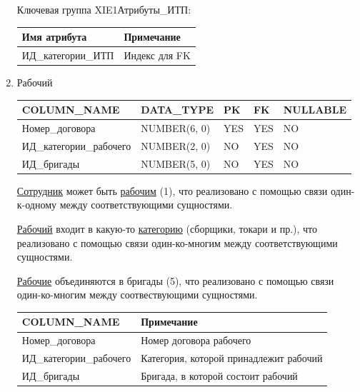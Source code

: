 \begin{enumerate}
\begin{tabular}{|p{4cm}|p{5cm}|}
    \end{tabular}

    Ключевая группа XIE1Атрибуты\_ИТП:

    \begin{tabular}{|p{4cm}|p{5cm}|} \hline

        {\bf Имя атрибута} & {\bf Примечание} \\ \hline
        ИД\_категории\_ИТП & Индекс для FK \\ \hline

    \end{tabular}

    \item{Рабочий}

    \begin{tabular}{|p{4cm}|p{3cm}|p{1cm}|p{1cm}|p{2cm}|} \hline

        {\bf COLUMN\_NAME} & {\bf DATA\_TYPE} & {\bf PK} & {\bf FK} & {\bf NULLABLE} \\ \hline
        Номер\_договора & NUMBER(6, 0) & YES & YES & NO \\ \hline
        ИД\_категории\_рабочего & NUMBER(2, 0) & NO & YES & NO \\ \hline
        ИД\_бригады & NUMBER(5, 0) & NO & YES & NO \\ \hline

    \end{tabular}

    \underline{Сотрудник} может быть \underline{рабочим} (1), что реализовано с помощью связи один-к-одному между соответствующими сущностями.

    \underline{Рабочий} входит в какую-то \underline{категорию} (сборщики, токари и пр.), что реализовано с помощью связи один-ко-многим между соответствующими сущностями.

    \underline{Рабочие} объединяются в бригады (5), что реализовано с помощью связи один-ко-многим между соотвествующими сущностями.

    \begin{tabular}{|p{4cm}|p{5cm}|} \hline

        {\bf COLUMN\_NAME} & {\bf Примечание} \\ \hline
        Номер\_договора & Номер договора рабочего \\ \hline
        ИД\_категории\_рабочего & Категория, которой принадлежит рабочий \\ \hline
        ИД\_бригады & Бригада, в которой состоит рабочий \\ \hline


\end{tabular}
\end{enumerate}
